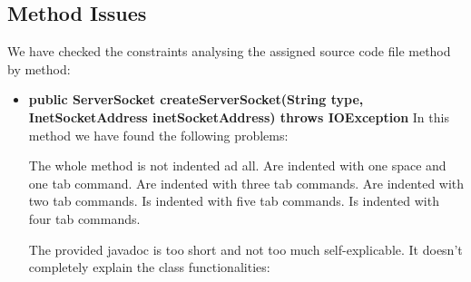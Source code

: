 \subsection{Method Issues}
We have checked the constraints analysing the assigned source code file method by method:
\begin{itemize}
	\item
		\textbf{public ServerSocket createServerSocket(String type, InetSocketAddress inetSocketAddress) throws IOException}
		In this method we have found the following problems:
		\begin{itemize}
				\begin{itemize}
						The whole method is not indented ad all.
						Are indented with one space and one tab command.
						Are indented with three tab commands.
						Are indented with two tab commands.
						Is indented with five tab commands.
						Is indented with four tab commands.
				\end{itemize}
				The provided javadoc is too short and not too much self-explicable. It doesn't completely explain the class functionalities:
	\end{itemize}
\end{itemize}